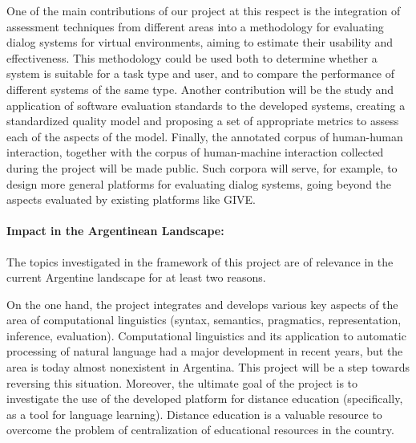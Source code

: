 One of the main contributions of our project at this respect is the
integration of assessment techniques from different areas into a methodology for
evaluating dialog systems for virtual environments, aiming to estimate their
usability and effectiveness. This methodology could be used both to determine
whether a system is suitable for a task type and user, and to compare the
performance of different systems of the same type.
Another contribution will be the study and application of software evaluation standards
to the developed systems, creating a standardized quality model and proposing
a set of appropriate metrics to assess each of the aspects of the model. 
Finally, the annotated corpus of human-human interaction, together with the corpus of
human-machine interaction collected during the project will be made public. Such
corpora will serve, for example, to design more general platforms for evaluating
dialog systems, going beyond the aspects evaluated by existing
platforms like GIVE.

\paragraph{Impact in the Argentinean Landscape:} The topics investigated in the 
framework of this project are of relevance in the
current Argentine landscape for at least two reasons.

On the one hand, the project integrates and develops various key aspects of the
area of computational linguistics (syntax, semantics, pragmatics,
representation, inference, evaluation). Computational linguistics
and its application to automatic processing of natural language had a major
development in recent years, but the area is today almost 
nonexistent in Argentina. This project will be a step towards reversing this situation. 
Moreover, the ultimate goal of the project is to investigate the use of the 
developed platform for distance education (specifically, as a tool for
language learning). Distance education is a valuable resource to overcome the problem of
centralization of educational resources in the country. 


